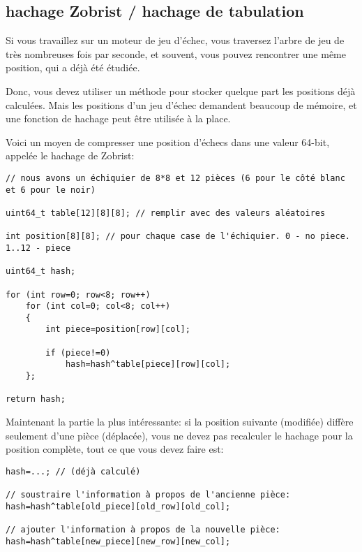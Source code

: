 ﻿\subsection{hachage Zobrist / hachage de tabulation}

Si vous travaillez sur un moteur de jeu d'échec, vous traversez l'arbre de jeu de
très nombreuses fois par seconde, et souvent, vous pouvez rencontrer une même position,
qui a déjà été étudiée.

Donc, vous devez utiliser un méthode pour stocker quelque part les positions déjà calculées.
Mais les positions d'un jeu d'échec demandent beaucoup de mémoire, et une fonction
de hachage peut être utilisée à la place.

Voici un moyen de compresser une position d'échecs dans une valeur 64-bit, appelée
le hachage de Zobrist:

\begin{lstlisting}[style=customc]
// nous avons un échiquier de 8*8 et 12 pièces (6 pour le côté blanc et 6 pour le noir)

uint64_t table[12][8][8]; // remplir avec des valeurs aléatoires

int position[8][8]; // pour chaque case de l'échiquier. 0 - no piece. 1..12 - piece

uint64_t hash;

for (int row=0; row<8; row++)
	for (int col=0; col<8; col++)
	{
		int piece=position[row][col];

		if (piece!=0)
			hash=hash^table[piece][row][col];
	};

return hash;
\end{lstlisting}

Maintenant la partie la plus intéressante: si la position suivante (modifiée) diffère
seulement d'une pièce (déplacée), vous ne devez pas recalculer le hachage pour la
position complète, tout ce que vous devez faire est:

\begin{lstlisting}[style=customc]
hash=...; // (déjà calculé)

// soustraire l'information à propos de l'ancienne pièce:
hash=hash^table[old_piece][old_row][old_col];

// ajouter l'information à propos de la nouvelle pièce:
hash=hash^table[new_piece][new_row][new_col];
\end{lstlisting}
